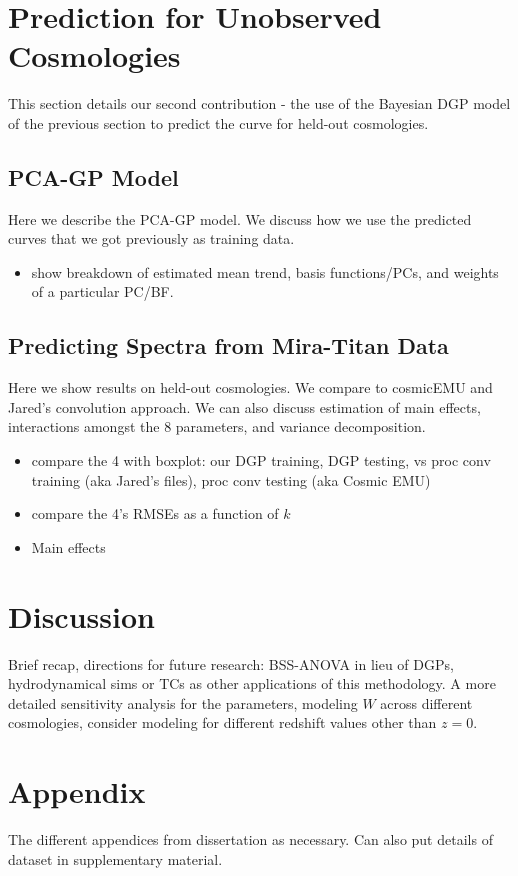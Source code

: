 \documentclass[11pt]{article}
\begin{document}
\section{Prediction for Unobserved Cosmologies}
\label{sec:pred}

This section details our second contribution - the use of the Bayesian DGP model of the previous section to predict the curve for held-out cosmologies.

\subsection{PCA-GP Model}
\label{subsec:pca}

Here we describe the PCA-GP model.  We discuss how we use the predicted curves that we got previously as training data.

\begin{itemize}
    \item show breakdown of estimated mean trend, basis functions/PCs, and weights of a particular PC/BF.
\end{itemize}

\subsection{Predicting Spectra from Mira-Titan Data}
\label{subsec:mira_pred}

Here we show results on held-out cosmologies.  We compare to cosmicEMU and Jared's convolution approach. We can also discuss estimation of main effects, interactions amongst the 8 parameters, and variance decomposition.

\begin{itemize}
    \item compare the 4 with boxplot: our DGP training, DGP testing, vs proc conv training (aka Jared's files), proc conv testing (aka Cosmic EMU)
    \item compare the 4's RMSEs as a function of $k$
    \item Main effects
\end{itemize}

\section{Discussion}
\label{sec:disc}

Brief recap, directions for future research: BSS-ANOVA in lieu of DGPs, hydrodynamical sims or TCs as other applications of this methodology. A more detailed sensitivity analysis for the parameters, modeling $W$ across different cosmologies, consider modeling for different redshift values other than $z=0$.

\section{Appendix}
\label{sec:apdx}

The different appendices from dissertation as necessary. Can also put details of dataset in supplementary material.



\end{document}
